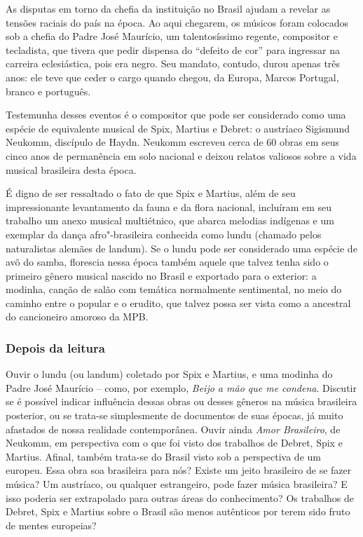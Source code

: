 \documentclass[11pt]{extarticle}
\begin{document}
As disputas em torno da chefia da instituição no Brasil ajudam a revelar as
tensões raciais do país na época. Ao aqui chegarem, os músicos foram colocados
sob a chefia do Padre José Maurício, um talentosíssimo regente, compositor e
tecladista, que tivera que pedir dispensa do “defeito de cor” para ingressar na
carreira eclesiástica, pois era negro. Seu mandato, contudo, durou apenas três
anos: ele teve que ceder o cargo quando chegou, da Europa, Marcos Portugal,
branco e português.

Testemunha desses eventos é o compositor que pode ser considerado como uma
espécie de equivalente musical de Spix, Martius e Debret: o austríaco Sigismund
Neukomm, discípulo de Haydn. Neukomm escreveu cerca de 60 obras em seus cinco
anos de permanência em solo nacional e deixou relatos valiosos sobre a vida
musical brasileira desta época.

É digno de ser ressaltado o fato de que Spix e Martius, além de seu
impressionante levantamento da fauna e da flora nacional, incluíram em seu
trabalho um anexo musical multiétnico, que abarca melodias indígenas e um
exemplar da dança afro"-brasileira conhecida como lundu (chamado pelos
naturalistas alemães de landum). Se o lundu pode ser considerado uma espécie de
avô do samba, florescia nessa época também aquele que talvez tenha sido o
primeiro gênero musical nascido no Brasil e exportado para o exterior: a
modinha, canção de salão com temática normalmente sentimental, no meio do
caminho entre o popular e o erudito, que talvez possa ser vista como a
ancestral do cancioneiro amoroso da MPB.

\subsubsection{Depois da leitura}

Ouvir o lundu (ou landum) coletado por Spix e Martius, e uma modinha do Padre
José Maurício – como, por exemplo, \emph{Beijo a mão que me condena}. Discutir se é
possível indicar influência dessas obras ou desses gêneros na música brasileira
posterior, ou se trata-se simplesmente de documentos de suas épocas, já muito
afastados de nossa realidade contemporânea. Ouvir ainda \emph{Amor Brasileiro}, de
Neukomm, em perspectiva com o que foi visto dos trabalhos de Debret, Spix e
Martius. Afinal, também trata-se do Brasil visto sob a perspectiva de um
europeu. Essa obra soa brasileira para nós? Existe um jeito brasileiro de se
fazer música? Um austríaco, ou qualquer estrangeiro, pode fazer música
brasileira? E isso poderia ser extrapolado para outras áreas do conhecimento?
Os trabalhos de Debret, Spix e Martius sobre o Brasil são menos autênticos por
terem sido fruto de mentes europeias?
\end{document}
